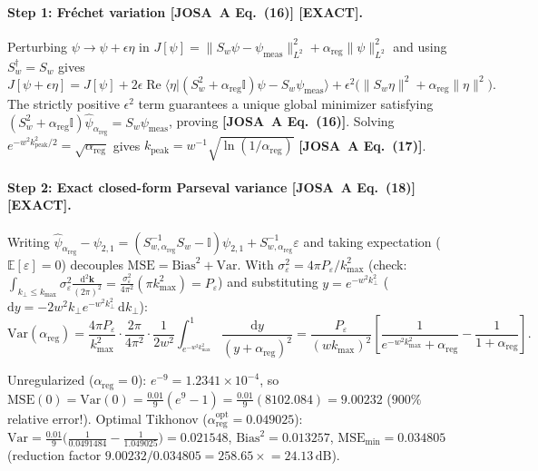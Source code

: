 \documentclass[10pt,letterpaper]{article}
\newcommand{\braket}[2]{\langle #1 | #2 \rangle}
\newcommand{\norm}[1]{\lVert #1 \rVert}
\newcommand{\dd}{\mathrm{d}}
\newcommand{\josa}[1]{\textbf{[JOSA~A Eq.~(#1)]}}
\newcommand{\tagexact}{\textcolor{forest}{\textbf{[EXACT]}}}
\numberwithin{equation}{section}
\begin{document}
\paragraph*{Step 1: Fr\'echet variation \josa{16} \tagexact{}.}
Perturbing $\psi \to \psi + \epsilon\eta$ in $J[\psi] = \norm{S_w\psi - \psi_{\mathrm{meas}}}_{L^2}^2 + \alpha_{\mathrm{reg}}\norm{\psi}_{L^2}^2$ and using $S_w^\dagger = S_w$ gives
\begin{equation}
  J[\psi + \epsilon\eta] = J[\psi] + 2\epsilon\operatorname{Re}\braket{\eta}{(S_w^2 + \alpha_{\mathrm{reg}}\mathbb{I})\psi - S_w\psi_{\mathrm{meas}}} + \epsilon^2\bigl(\norm{S_w\eta}^2 + \alpha_{\mathrm{reg}}\norm{\eta}^2\bigr).
\end{equation}
The strictly positive $\epsilon^2$ term guarantees a unique global minimizer satisfying $(S_w^2 + \alpha_{\mathrm{reg}}\mathbb{I})\hat{\psi}_{\alpha_{\mathrm{reg}}} = S_w\psi_{\mathrm{meas}}$, proving \josa{16}. Solving $e^{-w^2 k_{\mathrm{peak}}^2/2} = \sqrt{\alpha_{\mathrm{reg}}}$ gives $k_{\mathrm{peak}} = w^{-1}\sqrt{\ln(1/\alpha_{\mathrm{reg}})}$ \josa{17}.

\paragraph*{Step 2: Exact closed-form Parseval variance \josa{18} \tagexact{}.}
Writing $\hat{\psi}_{\alpha_{\mathrm{reg}}} - \psi_{2,1} = (S_{w,\alpha_{\mathrm{reg}}}^{-1}S_w - \mathbb{I})\psi_{2,1} + S_{w,\alpha_{\mathrm{reg}}}^{-1}\varepsilon$ and taking expectation ($\mathbb{E}[\varepsilon] = 0$) decouples $\mathrm{MSE} = \mathrm{Bias}^2 + \mathrm{Var}$. With $\sigma_\varepsilon^2 = 4\pi P_\varepsilon/k_{\max}^2$ (check: $\int_{k_\perp \le k_{\max}} \sigma_\varepsilon^2 \frac{\dd^2\mathbf{k}}{(2\pi)^2} = \frac{\sigma_\varepsilon^2}{4\pi^2}(\pi k_{\max}^2) = P_\varepsilon$) and substituting $y = e^{-w^2 k_\perp^2}$ ($\dd y = -2w^2 k_\perp e^{-w^2 k_\perp^2}\,\dd k_\perp$):
\begin{equation}
  \mathrm{Var}(\alpha_{\mathrm{reg}}) = \frac{4\pi P_\varepsilon}{k_{\max}^2}\cdot\frac{2\pi}{4\pi^2}\cdot\frac{1}{2w^2}\int_{e^{-w^2 k_{\max}^2}}^{1}\frac{\dd y}{(y+\alpha_{\mathrm{reg}})^2}
  = \frac{P_\varepsilon}{(w k_{\max})^2}\left[\frac{1}{e^{-w^2 k_{\max}^2}+\alpha_{\mathrm{reg}}} - \frac{1}{1+\alpha_{\mathrm{reg}}}\right].
\end{equation}

\begin{pencheck}[Hand Check of Unregularized Blow-Up vs.\ Optimal Tikhonov ($w k_{\max} = 3.0$, $P_\varepsilon = 0.01$)]
Unregularized ($\alpha_{\mathrm{reg}} = 0$): $e^{-9} = 1.2341\times 10^{-4}$, so $\mathrm{MSE}(0) = \mathrm{Var}(0) = \frac{0.01}{9}(e^9 - 1) = \frac{0.01}{9}(8102.084) = \mathbf{9.00232}$ ($900\%$ relative error!). Optimal Tikhonov ($\alpha_{\mathrm{reg}}^{\mathrm{opt}} = 0.049025$): $\mathrm{Var} = \frac{0.01}{9}\bigl(\frac{1}{0.0491484} - \frac{1}{1.049025}\bigr) = 0.021548$, $\mathrm{Bias}^2 = 0.013257$, $\mathrm{MSE}_{\min} = \mathbf{0.034805}$ (reduction factor $9.00232/0.034805 = \mathbf{258.65\times} = \mathbf{24.13\,\mathrm{dB}}$).
\end{pencheck}
\end{document}

